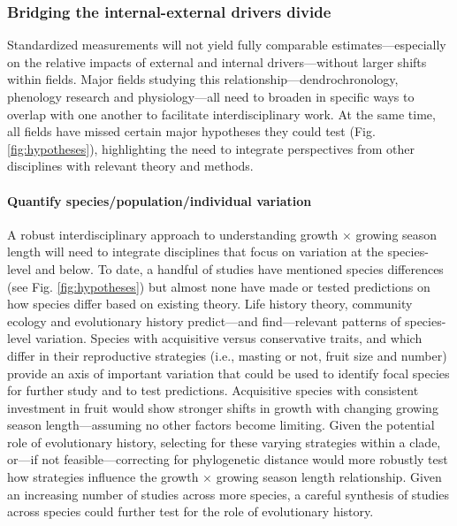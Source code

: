 \documentclass[11pt]{article}
\begin{document}
\subsubsection*{Bridging the internal-external drivers divide}

Standardized measurements will not yield fully comparable estimates---especially on the relative impacts of external and internal drivers---without larger shifts within fields. Major fields studying this relationship---dendrochronology, phenology research and physiology---all need to broaden in specific ways to overlap with one another to facilitate interdisciplinary work. At the same time, all fields have missed certain major hypotheses they could test (Fig. \ref{fig:hypotheses}), highlighting the need to integrate perspectives from other disciplines with relevant theory and methods. 

\paragraph{Quantify species/population/individual variation} 

A robust interdisciplinary approach to understanding growth $\times$ growing season length will need to integrate disciplines that focus on variation at the species-level and below. To date, a handful of studies have mentioned species differences (see Fig. \ref{fig:hypotheses}) but almost none have made or tested predictions on how species differ based on existing theory. Life history theory, community ecology and evolutionary history predict---and find---relevant patterns of species-level variation. Species with acquisitive versus conservative traits, and which differ in their reproductive strategies (i.e., masting or not, fruit size and number) provide an axis of important variation that could be used to identify focal species for further study and to test predictions. Acquisitive species with consistent investment in fruit would show stronger shifts in growth with changing growing season length---assuming no other factors become limiting. Given the potential role of evolutionary history, selecting for these varying strategies within a clade, or---if not feasible---correcting for phylogenetic distance would more robustly test how strategies influence the growth $\times$ growing season length relationship. Given an increasing number of studies across more species, a careful synthesis of studies across species could further test for the role of evolutionary history. 
\end{document}
